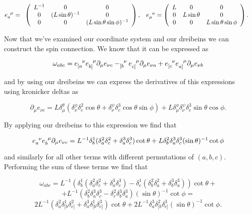 \begin{equation*}
e\eii{a}{\mu}=
\begin{array}{cc}
\left(
\begin{array}{ccc}
L^{-1} & 0 & 0\\
0 & (L\sin\theta)^{-1} & 0\\
0 & 0 & (L\sin\theta\sin\phi)^{-1}
\end{array}
\right),
&
e\eii{\mu}{a}=
\left(
\begin{array}{ccc}
L & 0 & 0\\
0 & L\sin\theta & 0\\
0 & 0 & L\sin\theta\sin\phi
\end{array}
\right).
\end{array}
\end{equation*}

Now that we've examined our coordinate system and our dreibeins we can construct the spin connection. We know that it can be expressed as

$$
\omega_{abc}=e\eii{[a}{\nu}e\eii{b]}{\mu}\partial_\mu e_{\nu c}-\eii{[b}{\nu}e\eii{c]}{\mu}\partial_\mu e_{\nu a}+e\eii{[c}{\nu}e\eii{a]}{\mu}\partial_\mu e_{\nu b}
$$

and by using our dreibeins we can express the derivatives of this expressions using kronicker deltas as 

$$
\partial_\mu e_{\nu c}=L\delta_\mu^\theta(\delta_\nu^\phi\delta_c^2\cos\theta+\delta_\nu^\psi\delta_c^3\cos\theta\sin\phi)+L\delta_\mu^\phi\delta_\nu^\psi\delta_c^3\sin\theta\cos\phi.
$$

By applying our dreibeins to this expression we find that 

$$
e\eii{a}{\nu}e\eii{b}{\mu}\partial_\mu e_{\nu c}=L^{-1}\delta_b^1(\delta_a^2\delta_c^2+\delta_a^3\delta_c^3)\cot\theta+L\delta_b^2\delta_a^3\delta_c^3(\sin\theta)^{-1}\cot\phi
$$

and similarly for all other terms with different permutations of $(a, b, c)$. Performing the sum of these terms we find that

\begin{equation*}
\omega_{abc}=L^{-1}\left(\delta_b^1\left(\delta_a^2\delta_c^2+\delta_a^3\delta_c^3\right)-\delta_c^1\left(\delta_b^2\delta_a^2+\delta_b^3\delta_a^3\right)\right)\cot\theta+
\end{equation*}
\begin{equation*}
+L^{-1}\left(\delta_b^2\delta_a^3\delta_c^3-\delta_c^2\delta_b^3\delta_a^3\right)\left(\sin\theta\right)^{-1}\cot{\phi}=
\end{equation*}
\begin{equation*}
2L^{-1}\left(\delta_a^2\delta_{[b}^1\delta_{c]}^2+\delta_a^3\delta_{[b}^1\delta_{c]}^3\right)\cot\theta+2L^{-1}\delta_a^3\delta_{[b}^2\delta_{c]}^3(\sin\theta)^{-1}\cot\phi.
\end{equation*}

